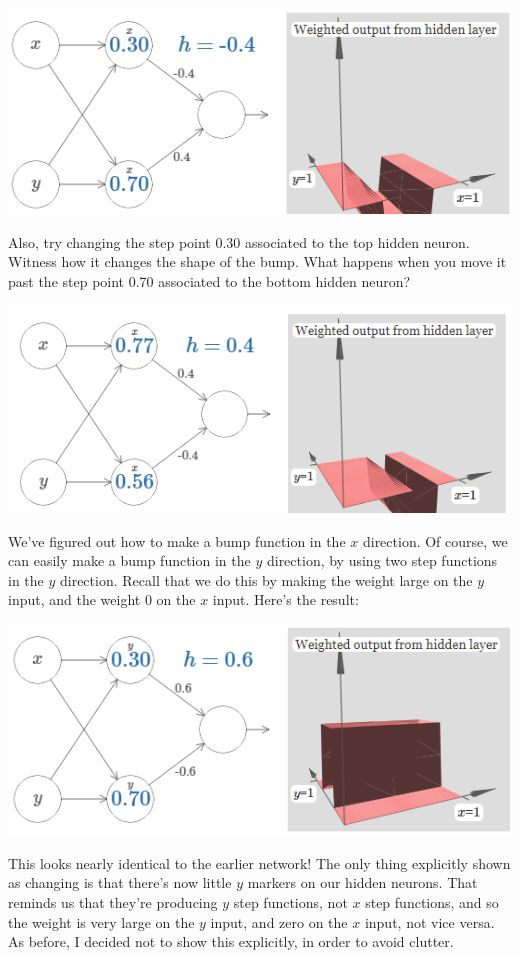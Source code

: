 {\centering \includegraphics[width=.7\textwidth,]{pic/wigglyfn27} \par}

Also, try changing the step point 0.30 associated to the top hidden neuron. Witness how it changes the shape of the bump. What happens when you move it past the step point 0.70
associated to the bottom hidden neuron?

{\centering \includegraphics[width=.7\textwidth,]{pic/wigglyfn28} \par}

We've figured out how to make a bump function in the $x$ direction. Of course, we can easily make a bump function in the $y$ direction, by using two step functions in the $y$ direction. Recall that we do this by making the weight large on the $y$ input, and the weight 0 on the $x$ input. Here's the result:

{\centering \includegraphics[width=.7\textwidth,]{pic/wigglyfn29} \par}

This looks nearly identical to the earlier network! The only thing explicitly shown as changing is that there's now little $y$ markers on our hidden neurons. That reminds us that they're producing $y$ step functions, not $x$ step functions, and so the weight is very large on the $y$ input, and zero on the $x$ input, not vice versa. As before, I decided not to show this explicitly, in order to avoid clutter.


